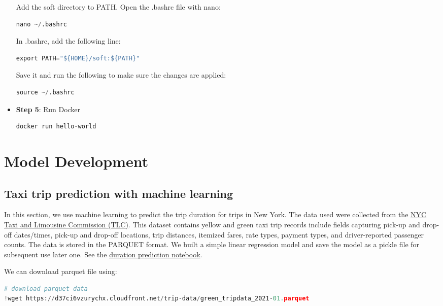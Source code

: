 \documentclass[letterpaper,12pt,notitlepage,twoside]{report}
\begin{document}
\begin{itemize}
Add the soft directory to PATH. Open the .bashrc file with nano:
\begin{lstlisting}[language=python, numbers=none]
nano ~/.bashrc
\end{lstlisting}
In .bashrc, add the following line:
\begin{lstlisting}[language=python, numbers=none]
export PATH="${HOME}/soft:${PATH}"
\end{lstlisting}
Save it and run the following to make sure the changes are applied:
\begin{lstlisting}[language=python, numbers=none]
source ~/.bashrc
\end{lstlisting}
\item \textbf{Step 5}: Run Docker
\begin{lstlisting}[language=python, numbers=none]
docker run hello-world
\end{lstlisting}
\end{itemize}

\section{Model Development}
\subsection{Taxi trip prediction with machine learning}
    \begin{example}[frametitle=\extitle{TLC Trip Prediction}]
      In this section, we use machine learning to predict the trip duration for trips in New York. The data used were collected from the \href{https://www.nyc.gov/site/tlc/about/tlc-trip-record-data.page}{NYC Taxi and Limousine Commission (TLC)}. This dataset contains yellow and green taxi trip records include fields capturing pick-up and drop-off dates/times, pick-up and drop-off locations, trip distances, itemized fares, rate types, payment types, and driver-reported passenger counts. The data is stored in the PARQUET format.  We built a simple linear regression model and save the model as a pickle file for subsequent use later one.  See the \href{https://github.com/chuksoo/mlops-zoomcamp-2024/blob/main/01%20-%20Intro/duration-prediction.ipynb}{duration prediction notebook}.
    \end{example}

We can download parquet file using:
\begin{lstlisting}[language=python, numbers=none]
# download parquet data
!wget https://d37ci6vzurychx.cloudfront.net/trip-data/green_tripdata_2021-01.parquet
\end{lstlisting}
\end{document}
